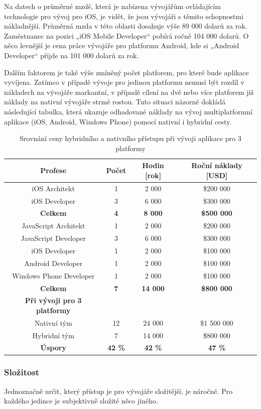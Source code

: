 Na datech o průměrné mzdě, která je nabízena vývojářům ovládajícím technologie pro vývoj pro iOS, je vidět, že jsou vývojáři s těmito schopnostmi nákladnější. Průměrná mzda v této oblasti dosahuje výše 89 000 dolarů za rok. Zaměstnanec na pozici „iOS Mobile Developer“ pobírá ročně 104 000 dolarů. O něco levnější je cena práce vývojáře pro platformu Android, kde si „Android Developer“ přijde na 101 000 dolarů za rok.

Dalším faktorem je také výše zmíněný počet platforem, pro které bude aplikace vyvíjena. Zatímco v případě vývoje pro jedinou platformu nemusí být rozdíl v nákladech na vývojáře markantní, v případě cílení na dvě nebo více platforem již náklady na nativní vývojáře strmě rostou. Tuto situaci názorně dokládá následující tabulka, která ukazuje odhadované náklady na vývoj multiplatformní aplikace (iOS, Android, Windows Phone) pomocí nativní i hybridní cesty.

\begin{table}\centering
	\caption[Srovnání ceny hybridního a nativního přístupu při vývoji aplikace pro 3 platformy]{Srovnání ceny hybridního a nativního přístupu při vývoji aplikace pro 3 platformy \cite{globant_hybrid}} 
	\label{tab:ComparsionCost}
		\begin{tabular}{|c|c|c|c|}\hline
			Profese	& Počet & Hodin [rok] & Roční náklady [USD]
			\tabularnewline \hline \hline
					iOS Architekt	& 1 & 2 000 & \$200 000
			\tabularnewline \hline
					iOS Developer	& 3 & 6 000 & \$300 000
			\tabularnewline \hline
				\textbf{Celkem}	& \textbf{4} & \textbf{8 000} & \textbf{\$500 000}
			\tabularnewline \hline \hline
				JavaScript Architekt	& 1 & 2 000 & \$200 000
			\tabularnewline \hline
				JavaScript Developer	& 3 & 6 000 & \$300 000
			\tabularnewline \hline
				iOS Developer	& 1 & 2 000 & \$100 000
			\tabularnewline \hline
				Android Developer	& 1 & 2 000 & \$100 000
			\tabularnewline \hline
				Windows Phone Developer	& 1 & 2 000 & \$100 000
			\tabularnewline \hline
				\textbf{Celkem}	& \textbf{7} & \textbf{14 000} & \textbf{\$800 000}
			\tabularnewline \hline \hline
				\textbf{Při vývoji pro 3 platformy} & & &
			\tabularnewline \hline
				Nativní tým & 12 & 24 000 & \$1 500 000
			\tabularnewline \hline
				Hybridní tým & 7 & 14 000 & \$800 000
			\tabularnewline \hline
				\textbf{Úspory}	& \textbf{42 \%} & \textbf{42 \%} & \textbf{47 \%}
			\tabularnewline \hline
		\end{tabular}
\end{table}

\subsubsection{Složitost}
Jednoznačně určit, který přístup je pro vývojáře složitější, je náročné. Pro každého jedince je subjektivně složité něco jiného.


